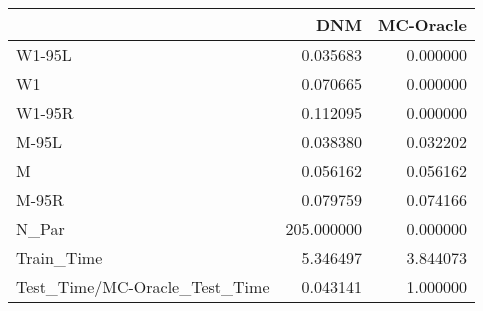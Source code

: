 \begin{tabular}{lrr}
\toprule
{} &         DNM &  MC-Oracle \\
\midrule
W1-95L                        &    0.035683 &   0.000000 \\
W1                            &    0.070665 &   0.000000 \\
W1-95R                        &    0.112095 &   0.000000 \\
M-95L                         &    0.038380 &   0.032202 \\
M                             &    0.056162 &   0.056162 \\
M-95R                         &    0.079759 &   0.074166 \\
N\_Par                         &  205.000000 &   0.000000 \\
Train\_Time                    &    5.346497 &   3.844073 \\
Test\_Time/MC-Oracle\_Test\_Time &    0.043141 &   1.000000 \\
\bottomrule
\end{tabular}
